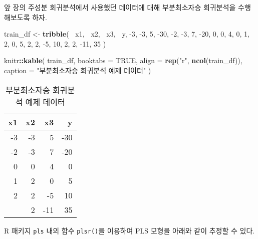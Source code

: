 \documentclass[]{book}
\newenvironment{Shaded}{\begin{snugshade}}{\end{snugshade}}
\newcommand{\DataTypeTok}[1]{\textcolor[rgb]{0.13,0.29,0.53}{#1}}
\newcommand{\DecValTok}[1]{\textcolor[rgb]{0.00,0.00,0.81}{#1}}
\newcommand{\KeywordTok}[1]{\textcolor[rgb]{0.13,0.29,0.53}{\textbf{#1}}}
\newcommand{\NormalTok}[1]{#1}
\newcommand{\OperatorTok}[1]{\textcolor[rgb]{0.81,0.36,0.00}{\textbf{#1}}}
\newcommand{\OtherTok}[1]{\textcolor[rgb]{0.56,0.35,0.01}{#1}}
\newcommand{\StringTok}[1]{\textcolor[rgb]{0.31,0.60,0.02}{#1}}
\begin{document}
앞 장의 주성분 회귀분석에서 사용했던 데이터에 대해 부분최소자승 회귀분석을 수행해보도록 하자.

\begin{Shaded}
\begin{Highlighting}[]
\NormalTok{train_df <-}\StringTok{ }\KeywordTok{tribble}\NormalTok{(}
  \OperatorTok{~}\NormalTok{x1, }\OperatorTok{~}\NormalTok{x2, }\OperatorTok{~}\NormalTok{x3, }\OperatorTok{~}\NormalTok{y,}
  \DecValTok{-3}\NormalTok{, }\DecValTok{-3}\NormalTok{, }\DecValTok{5}\NormalTok{, }\DecValTok{-30}\NormalTok{,}
  \DecValTok{-2}\NormalTok{, }\DecValTok{-3}\NormalTok{, }\DecValTok{7}\NormalTok{, }\DecValTok{-20}\NormalTok{,}
  \DecValTok{0}\NormalTok{, }\DecValTok{0}\NormalTok{, }\DecValTok{4}\NormalTok{, }\DecValTok{0}\NormalTok{,}
  \DecValTok{1}\NormalTok{, }\DecValTok{2}\NormalTok{, }\DecValTok{0}\NormalTok{, }\DecValTok{5}\NormalTok{,}
  \DecValTok{2}\NormalTok{, }\DecValTok{2}\NormalTok{, }\DecValTok{-5}\NormalTok{, }\DecValTok{10}\NormalTok{,}
  \DecValTok{2}\NormalTok{, }\DecValTok{2}\NormalTok{, }\DecValTok{-11}\NormalTok{, }\DecValTok{35}
\NormalTok{)}

\NormalTok{knitr}\OperatorTok{::}\KeywordTok{kable}\NormalTok{(}
\NormalTok{  train_df, }\DataTypeTok{booktabs =} \OtherTok{TRUE}\NormalTok{,}
  \DataTypeTok{align =} \KeywordTok{rep}\NormalTok{(}\StringTok{"r"}\NormalTok{, }\KeywordTok{ncol}\NormalTok{(train_df)),}
  \DataTypeTok{caption =} \StringTok{"부분최소자승 회귀분석 예제 데이터"}
\NormalTok{)}
\end{Highlighting}
\end{Shaded}

\begin{table}[t]

\caption{\label{tab:plsr-example-data}부분최소자승 회귀분석 예제 데이터}
\centering
\begin{tabular}{rrrr}
\toprule
x1 & x2 & x3 & y\\
\midrule
-3 & -3 & 5 & -30\\
-2 & -3 & 7 & -20\\
0 & 0 & 4 & 0\\
1 & 2 & 0 & 5\\
2 & 2 & -5 & 10\\
\addlinespace
2 & 2 & -11 & 35\\
\bottomrule
\end{tabular}
\end{table}

R 패키지 \texttt{pls} 내의 함수 \texttt{plsr()}을 이용하여 PLS 모형을 아래와 같이 추정할 수 있다.
\end{document}
